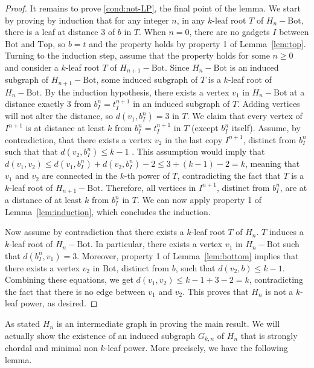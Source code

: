 \documentclass[11pt,letter]{article}
\theoremstyle{remark}
\newcommand{\T}{\text{Top}}
\newcommand{\B}{\text{Bot}}
\begin{document}
\begin{proof}
It remains to prove \ref{cond:not-LP}, the final point of the lemma. We start by proving by induction that for any integer $n$, in any $k$-leaf root $T$ of $H_n - \B$, there is a leaf at distance $3$ of $b$ in $T$. When $n = 0$, there are no gadgets $I$ between $\B$ and $\T$, so $b = t$ and the property holds by property 1 of Lemma~\ref{lem:top}. Turning to the induction step, assume that the property holds for some $n \geq 0$ and consider a $k$-leaf root $T$ of $H_{n+1}- \B$. Since $H_n - \B$ is an induced subgraph of $H_{n+1} - \B$, some induced subgraph of $T$ is a $k$-leaf root of $H_n- \B$. By the induction hypothesis, there exists a vertex $v_1$ in $H_n- \B$ at a distance exactly $3$ from $b_I^n = t_I^{n+1}$ in an induced subgraph of $T$. Adding vertices will not alter the distance, so $d(v_1,b_I^n) = 3$ in $T$.  We claim that every vertex of $I^{n+1}$ is at distance at least $k$ from $b_I^n = t_I^{n+1}$ in $T$ (except $b_I^n$ itself). Assume, by contradiction, that there exists a vertex $v_2$  in the last copy $I^{n+1}$, distinct from $b_I^n$ such that that $d(v_2, b_I^n) \leq k-1$ . This assumption would imply that $d(v_1, v_2) \leq d(v_1, b_I^n) + d(v_2, b_I^n) - 2 \leq 3 + (k-1) - 2 = k$, meaning that $v_1$ and $v_2$ are connected in the $k$-th power of $T$, contradicting the fact that $T$ is a $k$-leaf root of $H_{n+1}-\B$. Therefore, all vertices in $I^{n+1}$, distinct from $b_I^n$, are at a distance of at least $k$ from $b_I^n$ in $T$. We can now apply property 1 of Lemma~\ref{lem:induction}, which concludes the induction.

Now assume by contradiction that there exists a $k$-leaf root $T$ of $H_n$. $T$ induces a $k$-leaf root of $H_n - \B$. In particular, there exists a vertex $v_1$ in $H_n- \B$ such that $d(b_I^n, v_1) = 3$. Moreover, property 1 of Lemma~\ref{lem:bottom} implies that there exists a vertex $v_2$ in $\B$, distinct from $b$, such that $d(v_2, b) \leq k-1$. Combining these equations, we get $d(v_1, v_2) \leq k-1 + 3 - 2 = k$, contradicting the fact that there is no edge between $v_1$ and $v_2$. This proves that $H_n$ is not a $k$-leaf power, as desired.
\end{proof}

As stated $H_n$ is an intermediate graph in proving the main result. 
We will actually show the existence
of an induced subgraph $G_{k,n}$ of $H_n$
that is strongly chordal and minimal non $k$-leaf power.
More precisely, we have the following lemma.
\end{document}
